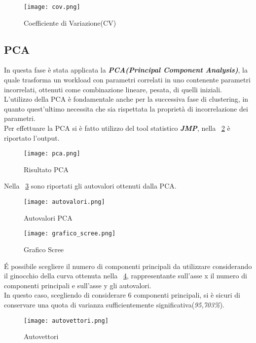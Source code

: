 \begin{figure}[!htbp]
  \centering
	\texttt{[image: cov.png]}
  \caption{Coefficiente di Variazione(CV)}
  \label{pca_cv}
\end{figure}
\clearpage

\subsection{PCA}
In questa fase è stata applicata la
\textbf{\textit{PCA(Principal Component Analysis)}},
la quale trasforma un workload con parametri correlati in uno contenente parametri
incorrelati, ottenuti come combinazione lineare, pesata, di quelli iniziali.\\
L'utilizzo della PCA è fondamentale anche per la successiva fase di clustering, in
quanto quest'ultimo necessita che sia rispettata la proprietà di incorrelazione
dei parametri.\\
Per effettuare la PCA si è fatto utilizzo del tool statistico \textit{\textbf{JMP}}, nella
\figurename~\ref{pca_pca} è riportato l'output.\\

\begin{figure}[!htbp]
	\texttt{[image: pca.png]}
  \caption{Risultato PCA}
  \label{pca_pca}
\end{figure}

\clearpage

Nella \figurename~\ref{pca_autovalori} sono riportati gli autovalori ottenuti dalla PCA.\\

\begin{figure}[!htbp]
	\texttt{[image: autovalori.png]}
  \caption{Autovalori PCA}
  \label{pca_autovalori}
\end{figure}

\clearpage

\begin{figure}[!htbp]
	\texttt{[image: grafico\_scree.png]}
  \caption{Grafico Scree}
  \label{pca_grafico_scree}
\end{figure}

\'E possibile scegliere il numero di componenti principali da utilizzare considerando
il ginocchio della curva ottenuta nella \figurename~\ref{pca_grafico_scree}, rappresentante
sull'asse x il numero di componenti principali e sull'asse y
gli autovalori.\\
In questo caso, scegliendo di considerare 6 componenti principali, si è sicuri di conservare una quota di varianza sufficientemente
significativa(\textit{95,703\%}).\\
\clearpage
\begin{figure}[!htbp]
	\texttt{[image: autovettori.png]}
  \caption{Autovettori}
  \label{pca_autovettori}
\end{figure}

